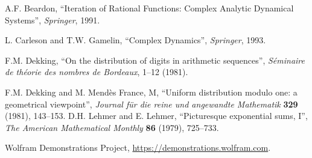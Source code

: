 \documentclass[11pt,leqno]{article}
\begin{document}
\begin{thebibliography}{99}

A.F. Beardon,
``Iteration of Rational Functions: Complex Analytic Dynamical Systems'',
\textit{Springer}, 1991.

L. Carleson and T.W. Gamelin, ``Complex Dynamics'',
\textit{Springer}, 1993.


F.M. Dekking, ``On the distribution of digits in arithmetic sequences'',
\textit{Séminaire de théorie des nombres de Bordeaux}, 1--12 (1981).

F.M. Dekking and M. Mend\`es France, M, 
``Uniform distribution modulo one: a geometrical viewpoint'', 
\textit{Journal f\"ur die reine und angewandte Mathematik} \textbf{329}
(1981),  143--153.
D.H. Lehmer and E. Lehmer,  ``Picturesque exponential sums, I'',
\textit{The American Mathematical Monthly} \textbf{86} (1979), 725--733.

Wolfram Demonstrations Project, \url{https://demonstrations.wolfram.com}.

\end{thebibliography}
\end{document}
